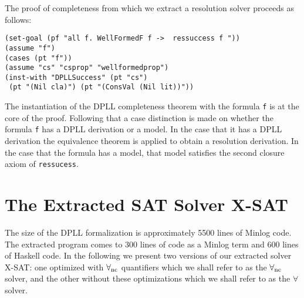 The proof of completeness from which we extract a resolution solver proceeds as follows:

\begin{lstlisting}[caption = "Beginning of the Resolution Completeness Proof"]
(set-goal (pf "all f. WellFormedF f ->  ressuccess f "))
(assume "f")
(cases (pt "f"))
(assume "cs" "csprop" "wellformedprop")
(inst-with "DPLLSuccess" (pt "cs") 
 (pt "(Nil cla)") (pt "(ConsVal (Nil lit))"))
\end{lstlisting}

The instantiation of the DPLL completeness theorem with the formula  \texttt{f} is at the core of the proof. Following that a case distinction is made on whether the formula \texttt{f} has a DPLL derivation or a model. In the case that it has a DPLL derivation the equivalence theorem is applied to obtain a resolution derivation. In the case that the formula has a model, that model satisfies the second closure axiom of \texttt{ressucess}. 

\section{The Extracted SAT Solver X-SAT}\label{chapter:dpllprogram} \label{section:dpllapp}
\label{sec:program}
The size of the DPLL formalization 
is approximately 5500  lines of Minlog code. The extracted program comes to 300 lines of code as a Minlog term and  600 lines of Haskell code. In the following we present two versions of our extracted solver X-SAT: one optimized with $\forall_{\mathrm{nc}}$ quantifiers which we shall refer to as the $\forall_{\mathrm{nc}}$ solver, and the other without these optimizations which we shall refer to as the $\forall$ solver.
  
